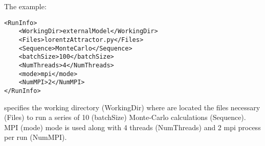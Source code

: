 The example:
\begin{lstlisting}[style=XML]
<RunInfo>
    <WorkingDir>externalModel</WorkingDir>
    <Files>lorentzAttractor.py</Files>
    <Sequence>MonteCarlo</Sequence>
    <batchSize>100</batchSize>
    <NumThreads>4</NumThreads>    
    <mode>mpi</mode>
    <NumMPI>2</NumMPI>
</RunInfo>
\end{lstlisting}
specifies the working directory (WorkingDir) where are located the files necessary (Files) to run a series of 10 (batchSize) Monte-Carlo calculations (Sequence).
MPI (mode) mode is used along with 4 threads (NumThreads) and 2 mpi process per run (NumMPI).